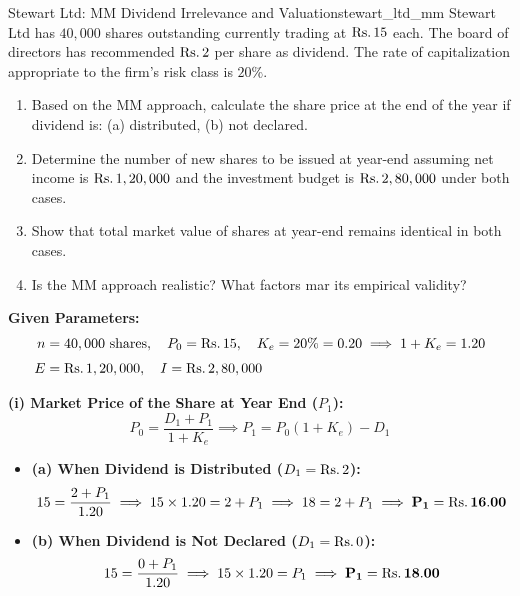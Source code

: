 \begin{example}{Stewart Ltd: MM Dividend Irrelevance and Valuation}{stewart_ltd_mm}
Stewart Ltd has $40,000$ shares outstanding currently trading at $\text{Rs.}\, 15$ each. The board of directors has recommended $\text{Rs.}\, 2$ per share as dividend. The rate of capitalization appropriate to the firm's risk class is $20\%$.
\begin{enumerate}[noitemsep, topsep=2pt]
    \item Based on the MM approach, calculate the share price at the end of the year if dividend is: (a) distributed, (b) not declared.
    \item Determine the number of new shares to be issued at year-end assuming net income is $\text{Rs.}\, 1,20,000$ and the investment budget is $\text{Rs.}\, 2,80,000$ under both cases.
    \item Show that total market value of shares at year-end remains identical in both cases.
    \item Is the MM approach realistic? What factors mar its empirical validity?
\end{enumerate}
\tcblower
\textbf{Given Parameters:}
\begin{align*}
    n &= 40,000 \text{ shares}, \quad P_0 = \text{Rs.}\, 15, \quad K_e = 20\% = 0.20 \implies 1 + K_e = 1.20 \\[3pt]
    E &= \text{Rs.}\, 1,20,000, \quad I = \text{Rs.}\, 2,80,000
\end{align*}

\textbf{(i) Market Price of the Share at Year End ($P_1$):}
\begin{equation*}
    P_0 = \frac{D_1 + P_1}{1 + K_e} \implies P_1 = P_0(1 + K_e) - D_1
\end{equation*}
\begin{itemize}[noitemsep, topsep=2pt]
    \item \textbf{(a) When Dividend is Distributed ($D_1 = \text{Rs.}\, 2$):}
    \begin{equation*}
        15 = \frac{2 + P_1}{1.20} \implies 15 \times 1.20 = 2 + P_1 \implies 18 = 2 + P_1 \implies \mathbf{P_1 = \text{Rs.}\, 16.00}
    \end{equation*}
    \item \textbf{(b) When Dividend is Not Declared ($D_1 = \text{Rs.}\, 0$):}
    \begin{equation*}
        15 = \frac{0 + P_1}{1.20} \implies 15 \times 1.20 = P_1 \implies \mathbf{P_1 = \text{Rs.}\, 18.00}
    \end{equation*}
\end{itemize}


\end{example}
